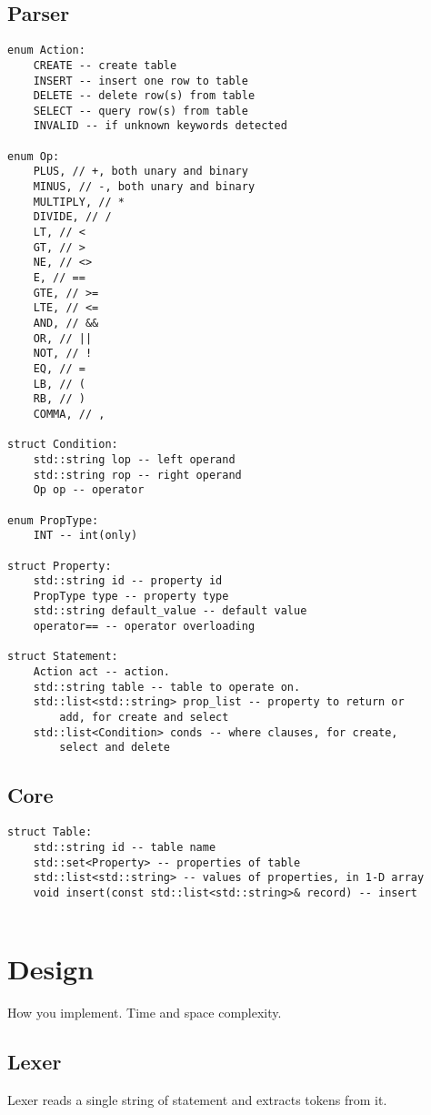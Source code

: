\documentclass[12pt,a4paper,oneside,draft]{report}
\begin{document}
\subsection{Parser}
\begin{verbatim}
enum Action:
    CREATE -- create table
    INSERT -- insert one row to table
    DELETE -- delete row(s) from table
    SELECT -- query row(s) from table
    INVALID -- if unknown keywords detected

enum Op:
    PLUS, // +, both unary and binary
    MINUS, // -, both unary and binary
    MULTIPLY, // *
    DIVIDE, // /
    LT, // <
    GT, // >
    NE, // <>
    E, // ==
    GTE, // >=
    LTE, // <=
    AND, // &&
    OR, // ||
    NOT, // !
    EQ, // =
    LB, // (
    RB, // )
    COMMA, // ,

struct Condition:
    std::string lop -- left operand
    std::string rop -- right operand
    Op op -- operator

enum PropType:
    INT -- int(only)

struct Property:
    std::string id -- property id
    PropType type -- property type    
    std::string default_value -- default value
    operator== -- operator overloading
    
struct Statement:
    Action act -- action.
    std::string table -- table to operate on.
    std::list<std::string> prop_list -- property to return or
        add, for create and select
    std::list<Condition> conds -- where clauses, for create,
        select and delete
\end{verbatim}

\subsection{Core}
\begin{verbatim}
struct Table:
    std::string id -- table name
    std::set<Property> -- properties of table
    std::list<std::string> -- values of properties, in 1-D array
    void insert(const std::list<std::string>& record) -- insert
     
\end{verbatim}

\section{Design}
How you implement.
Time and space complexity.
\subsection{Lexer}
Lexer reads a single string of statement and extracts tokens from it.
\end{document}
